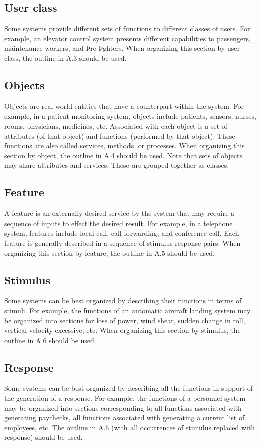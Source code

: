 	\subsection{User class}
		Some systems provide different sets of functions to different classes of users. For example, an elevator control system presents different capabilities to passengers, maintenance workers, and Þre Þghters. When organizing this section by user class, the outline in A.3 should be used.
	
	\subsection{Objects}
		Objects are real-world entities that have a counterpart within the system. For example, in a patient monitoring system, objects include patients, sensors, nurses, rooms, physicians, medicines, etc. Associated with each object is a set of attributes (of that object) and functions (performed by that object). These functions are also called services, methods, or processes. When organizing this section by object, the outline in A.4 should be used. Note that sets of objects may share attributes and services. These are grouped together as classes.
	
	\subsection{Feature}
		A feature is an externally desired service by the system that may require a sequence of inputs to effect the desired result. For example, in a telephone system, features include local call, call forwarding, and conference call. Each feature is generally described in a sequence of stimulus-response pairs. When organizing this section by feature, the outline in A.5 should be used.
	
	\subsection{Stimulus}
		Some systems can be best organized by describing their functions in terms of stimuli. For example, the functions of an automatic aircraft landing system may be organized into sections for loss of power, wind shear, sudden change in roll, vertical velocity excessive, etc. When organizing this section by stimulus, the outline in A.6 should be used.
	
	\subsection{Response}
		Some systems can be best organized by describing all the functions in support of the generation of a response. For example, the functions of a personnel system may be organized into sections corresponding to all functions associated with generating paychecks, all functions associated with generating a current list of employees, etc. The outline in A.6 (with all occurrences of stimulus replaced with response) should be used.
	
